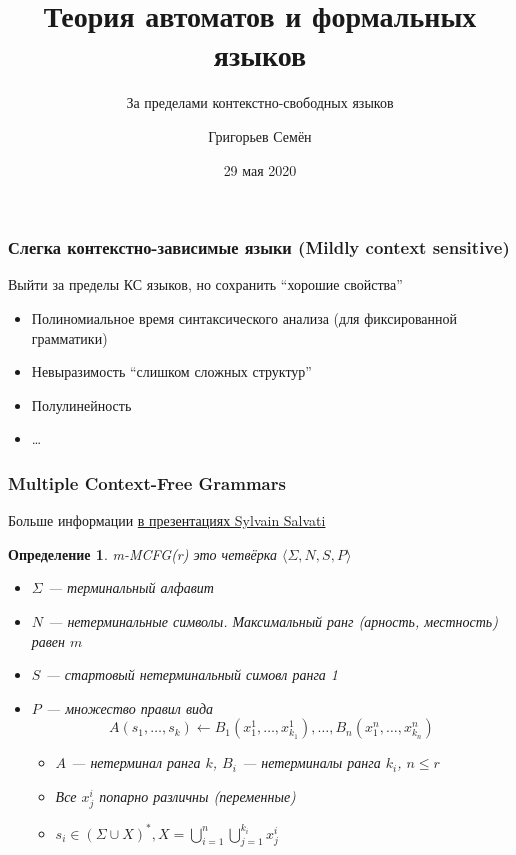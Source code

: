\documentclass{beamer}
\title[]{Теория автоматов и формальных языков}
\subtitle[]{За пределами контекстно-свободных языков}
\institute[]{
Санкт-Петербургский государственный университет\\
}
\author[]{Григорьев Семён}
\date{29 мая 2020}
\newtheorem{rudefinition}{Определение}
\begin{document}
{
  \begin{frame}
    \titlepage
  \end{frame}
}

\begin{frame}[fragile]  
  \frametitle{Слегка контекстно-зависимые языки (Mildly context sensitive)}
   Выйти за пределы КС языков, но сохранить ``хорошие свойства''
   \begin{itemize}
    \item Полиномиальное время синтаксического анализа (для фиксированной грамматики)
    \item Невыразимость ``слишком сложных структур''
    \item Полулинейность
    \item \ldots
   \end{itemize}
\end{frame}


\begin{frame}[fragile]
  \frametitle{Multiple Context-Free Grammars}
  Больше информации \href{https://www.labri.fr/perso/salvati/downloads/cours/esslli/}{в презентациях Sylvain Salvati}
  \begin{rudefinition}
    \textit{m-MCFG(r)} это четвёрка $\langle \Sigma, N, S, P \rangle$  
    \begin{itemize}
      \item $\Sigma$ --- терминальный алфавит
      \item $N$ --- нетерминальные символы. Максимальный ранг (арность, местность) равен $m$ 
      \item $S$ --- стартовый нетерминальный симовл ранга 1
      \item $P$ --- множество правил вида 
      $$
      A(s_1,\ldots,s_k) \leftarrow B_1(x_1^1,\ldots,x_{k_1}^1), \ldots, B_n(x_1^n,\ldots,x_{k_n}^n)  
      $$
      \begin{itemize}
        \item $A$ --- нетерминал ранга $k$, $B_i$ --- нетерминалы ранга $k_i$, $n \leq r$
        \item Все $x^i_j$ попарно различны (переменные)
        \item $s_i \in (\Sigma \cup X)^*, X = \bigcup_{i=1}^n \bigcup_{j=1}^{k_i} {x^i_j}$        
      \end{itemize}    
  \end{itemize}
  \end{rudefinition}
\end{frame}
\end{document}

